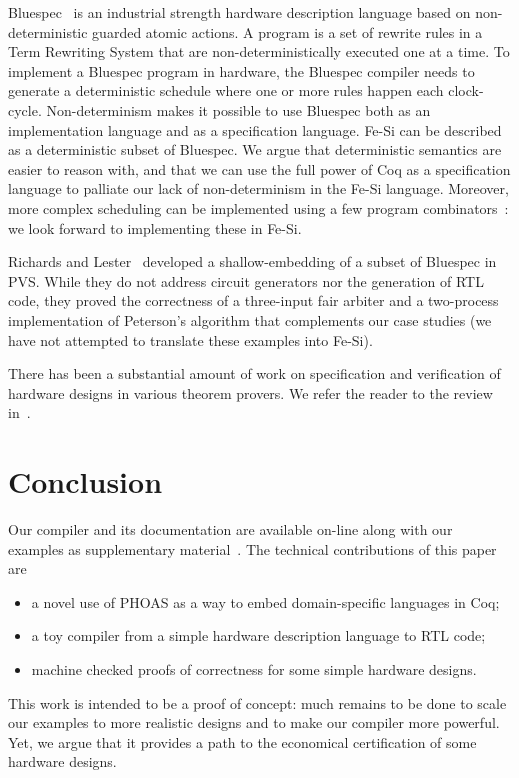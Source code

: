 \documentclass{llncs}
\begin{document}
\medskip

Bluespec~\cite{bluespec} is an industrial strength hardware
description language based on non-deterministic guarded atomic
actions. A program is a set of rewrite rules in a Term Rewriting
System that are non-deterministically executed one at a time. 
%
To implement a Bluespec program in hardware, the Bluespec compiler
needs to generate a deterministic schedule where one or more rules
happen each clock-cycle.
%
Non-determinism makes it possible to use Bluespec both as an
implementation language and as a specification language.
%
%
%
Fe-Si can be described as a deterministic subset of Bluespec. 
%
We argue that deterministic semantics are easier to reason with, and
that we can use the full power of Coq as a specification language to
palliate our lack of non-determinism in the Fe-Si language.
%
Moreover, more complex scheduling can be implemented using a few
program combinators~\cite{DBLP:conf/memocode/DaveAP07}: we look
forward to implementing these in Fe-Si. 

Richards and Lester~\cite{DBLP:journals/isse/RichardsL11} developed a
shallow-embedding of a subset of Bluespec in PVS. While they do not
address circuit generators nor the generation of RTL code, they proved
the correctness of a three-input fair arbiter and a two-process
implementation of Peterson's algorithm that complements our case
studies (we have not attempted to translate these examples into Fe-Si).

\medskip 

There has been a substantial amount of work on specification and
verification of hardware designs in various theorem provers. We refer
the reader to the review in~\cite{DBLP:conf/cpp/Braibant11}.


\section{Conclusion}
Our compiler and its documentation are available on-line along with
our examples as supplementary material~\cite{fesi}. 
%
The technical contributions of this paper are
\begin{itemize}
\item a novel use of PHOAS as a way to embed domain-specific languages
  in Coq;
\item a toy compiler from a simple hardware description language to
  RTL code;
\item machine checked proofs of correctness for some simple hardware
  designs. 
\end{itemize}

This work is intended to be a proof of concept: much remains to be
done to scale our examples to more realistic designs and to make our
compiler more powerful. Yet, we argue that it provides a path to
the economical certification of some hardware designs. 


\end{document}
